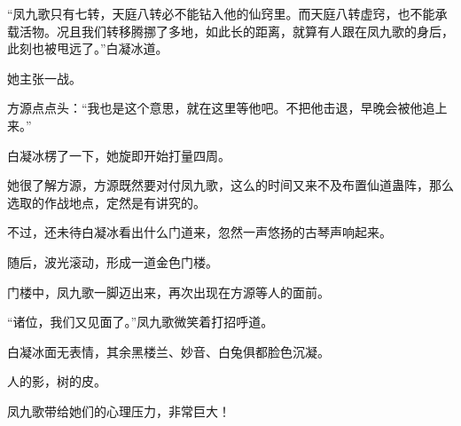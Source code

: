 \begin{this_body}
“凤九歌只有七转，天庭八转必不能钻入他的仙窍里。而天庭八转虚窍，也不能承载活物。况且我们转移腾挪了多地，如此长的距离，就算有人跟在凤九歌的身后，此刻也被甩远了。”白凝冰道。

她主张一战。

方源点点头：“我也是这个意思，就在这里等他吧。不把他击退，早晚会被他追上来。”

白凝冰楞了一下，她旋即开始打量四周。

她很了解方源，方源既然要对付凤九歌，这么的时间又来不及布置仙道蛊阵，那么选取的作战地点，定然是有讲究的。

不过，还未待白凝冰看出什么门道来，忽然一声悠扬的古琴声响起来。

随后，波光滚动，形成一道金色门楼。

门楼中，凤九歌一脚迈出来，再次出现在方源等人的面前。

“诸位，我们又见面了。”凤九歌微笑着打招呼道。

白凝冰面无表情，其余黑楼兰、妙音、白兔俱都脸色沉凝。

人的影，树的皮。

凤九歌带给她们的心理压力，非常巨大！

\end{this_body}

